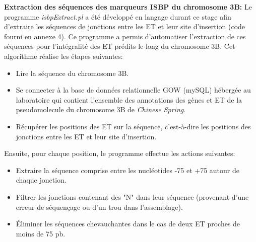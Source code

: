 \documentclass[a4paper, 12pt]{article}
\begin{document}
\begin{onehalfspace}
\textbf{Extraction des séquences des marqueurs ISBP du chromosome 3B:} Le programme \textit{isbpExtract.pl} a été développé en langage  durant ce stage afin d'extraire les séquences de jonctions entre les ET et leur site d'insertion (code fourni en annexe 4). Ce programme a permis d'automatiser l'extraction de ces séquences pour l'intégralité des ET prédits le long du chromosome 3B. Cet algorithme réalise les étapes suivantes:
\begin{itemize}
\item Lire la séquence du chromosome 3B.
\item Se connecter à la base de données relationnelle GOW (mySQL) hébergée au laboratoire qui contient l'ensemble des annotations des gènes et ET de la pseudomolecule du chromosome 3B de \textit{Chinese Spring}.
\item Récupérer les positions des ET sur la séquence, c'est-à-dire les positions des jonctions entre les ET et leur site d'insertion.
\end{itemize}
Ensuite, pour chaque position, le programme effectue les actions suivantes:
\begin{itemize}
\item Extraire la séquence comprise entre les nucléotides -75 et +75 autour de chaque jonction.
\item Filtrer les jonctions contenant des "N" dans leur séquence (provenant d'une erreur de séquençage ou d'un trou dans l'assemblage).
\item Éliminer les séquences chevauchantes dans le cas de deux ET proches de moins de 75 pb.
\end{itemize}


\end{onehalfspace}
\end{document}
